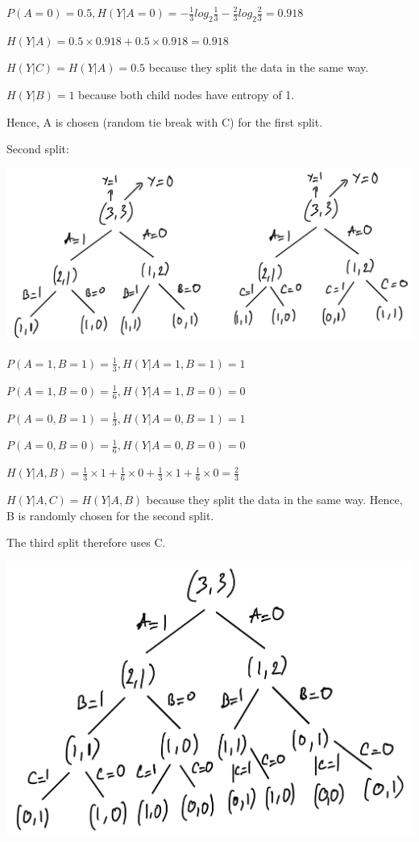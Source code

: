 \documentclass{article}
\begin{document}
\begin{enumerate}
{$P(A=0) = 0.5, H(Y|A=0) = - \frac{1}{3} log_2 \frac{1}{3} - \frac{2}{3} log_2 \frac{2}{3} = 0.918$

$H(Y|A) = 0.5 \times 0.918 + 0.5 \times 0.918 = 0.918$

$H(Y|C) = H(Y|A) = 0.5$ because they split the data in the same way.

$H(Y|B) = 1$ because both child nodes have entropy of 1.

Hence, A is chosen (random tie break with C) for the first split.

Second split:
\begin{center}
    \includegraphics[scale=0.3]{q32.png}
\end{center}
$P(A=1,B=1) = \frac{1}{3}, H(Y|A=1,B=1) = 1$

$P(A=1,B=0) = \frac{1}{6}, H(Y|A=1,B=0) = 0$

$P(A=0,B=1) = \frac{1}{3}, H(Y|A=0,B=1) = 1$

$P(A=0,B=0) = \frac{1}{6}, H(Y|A=0,B=0) = 0$

$H(Y|A,B) = \frac{1}{3} \times 1 + \frac{1}{6} \times 0 + \frac{1}{3} \times 1 + \frac{1}{6} \times 0 = \frac{2}{3}$

$H(Y|A,C) = H(Y|A,B)$ because they split the data in the same way. Hence, B is randomly chosen for the second split.

The third split therefore uses C.

\begin{center}
    \includegraphics[scale=0.3]{q33.png}
\end{center}

}
\end{enumerate}
\end{document}
